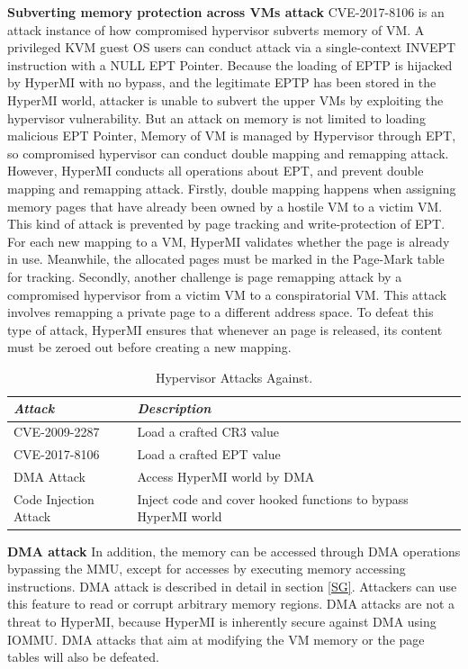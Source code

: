 \documentclass[conference]{IEEEtran}
\begin{document}
\textbf{Subverting memory protection across VMs attack}
CVE-2017-8106 is an attack instance of how compromised hypervisor subverts memory of VM. A privileged KVM guest OS users can conduct attack via a single-context INVEPT instruction with a NULL EPT Pointer. Because the loading of EPTP is hijacked by HyperMI with no bypass, and the legitimate EPTP has been stored in the HyperMI world, attacker is unable to subvert the upper VMs by exploiting the hypervisor vulnerability. 
But an attack on memory is not limited to loading malicious EPT Pointer, 
Memory of VM is managed by Hypervisor through EPT, so compromised hypervisor can conduct double mapping and remapping attack. However, HyperMI conducts all operations about EPT, and prevent double mapping and remapping attack.
Firstly, double mapping happens when assigning memory pages that have already been owned by a hostile VM to a victim VM. This kind of attack is prevented by page tracking and write-protection of EPT. For each new mapping to a VM, HyperMI validates whether the page is already in use. Meanwhile, the allocated pages must be marked in the Page-Mark table for tracking. Secondly, another challenge is page remapping attack by a compromised hypervisor from a victim VM to a conspiratorial VM. This attack involves remapping a private page to a different address space. To defeat this type of attack, HyperMI ensures that whenever an page is released, its content must be zeroed out before creating a new mapping.


\begin{table}
\centering
\caption{Hypervisor Attacks Against.}\label{tab3}
\begin{tabular}{p{2.4cm}|p{5.5cm}}
\hline
{\itshape\bfseries Attack} & {\itshape\bfseries Description} \\
\hline
CVE-2009-2287 & Load a crafted CR3 value\\
\hline
CVE-2017-8106 & Load a crafted EPT value \\
\hline
DMA Attack & Access HyperMI world by DMA \\
\hline
Code Injection Attack & Inject code and cover hooked functions to bypass HyperMI world \\
\hline
\end{tabular}
\end{table}



\textbf{DMA attack}
In addition, the memory can be accessed through DMA operations bypassing the MMU, except for accesses by executing memory accessing instructions. DMA attack is described in detail in section \ref{SG}. Attackers can use this feature to read or corrupt arbitrary memory regions. DMA attacks are not a threat to HyperMI, because HyperMI is inherently secure against DMA using IOMMU. DMA attacks that aim at modifying the VM memory or the page tables will also be defeated.
\end{document}
